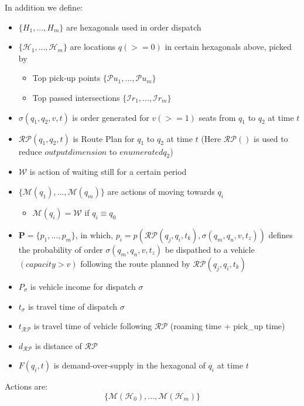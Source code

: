 \documentclass{article}
\begin{document}
\noindent
In addition we define:
\begin{itemize}
    \item $\{H_1,...,H_m\}$ are hexagonals used in order dispatch
    \item $\{\mathcal{H}_1,...,\mathcal{H}_m\}$ are locations $q (>=0)$ in certain hexagonals above, picked by
    \begin{itemize}
        \item Top pick-up points $\{\mathcal{P}u_1,...,\mathcal{P}u_m\}$
        \item Top passed intersections $\{\mathcal{I}r_1,...,\mathcal{I}r_m\}$
    \end{itemize}
    \item $\sigma(q_1,q_2,v,t)$ is order generated for $v (>=1)$ seats from $q_1$ to $q_2$ at time $t$
    \item $\mathcal{RP}\left(q_1, q_2, t\right)$ is Route Plan for $q_1$ to $q_2$ at time $t$
            (Here $\mathcal{RP}()$ is used to reduce $output dimension$ to $enumerated q_2$)
    \item $\mathcal{W}$ is action of waiting still for a certain period
    \item $\{\mathcal{M}(q_1),...,\mathcal{M}(q_m)\}$ are actions of moving towards $q_i$
    \begin{itemize}
        \item $\mathcal{M}(q_i)=\mathcal{W}$ if $q_i\equiv q_0$
    \end{itemize}
    \item $\mathbf{P} = \{p_1,...,p_m\}$, in which, 
        $p_i = p(\mathcal{RP}(q_j, q_i, t_k),\sigma(q_m,q_n,v,t_z))$ 
        defines the probability of order $\sigma(q_m,q_n,v,t_z)$ 
        be dispathed to a vehicle $(capacity>v)$ 
        following the route planned by $\mathcal{RP}(q_j, q_i, t_k)$
    \item $P_{\sigma}$ is vehicle income for dispatch $\sigma$
    \item $t_{\sigma}$ is travel time of dispatch $\sigma$
    \item $t_{\mathcal{RP}}$ is travel time of vehicle following $\mathcal{RP}$ (roaming time + pick_up time)
    \item $d_{\mathcal{RP}}$ is distance of $\mathcal{RP}$
    \item $F(q_i,t)$ is demand-over-supply in the hexagonal of $q_i$ at time $t$
\end{itemize}

\noindent
Actions are:
\begin{equation}
    \label{action}
    \{\mathcal{M}(\mathcal{H}_0),...,\mathcal{M}(\mathcal{H}_m)\}
\end{equation}
\end{document}
